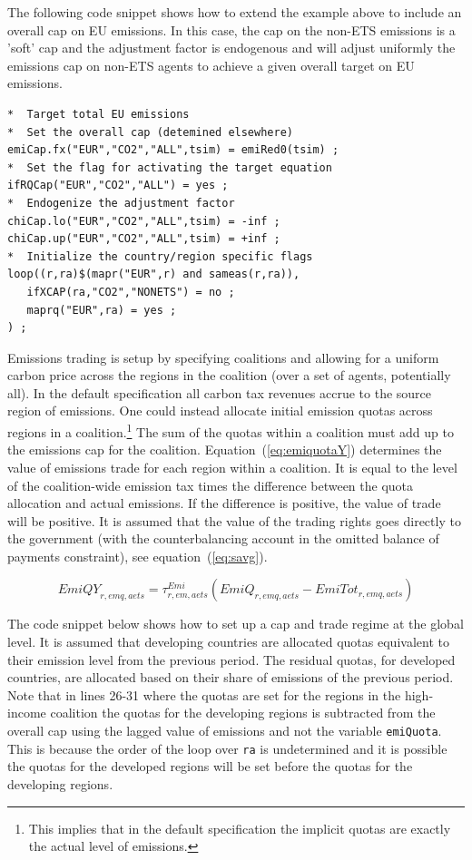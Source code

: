 \documentclass[11pt,letterpaper]{report}
\begin{document}
The following code snippet shows how to extend the example above to include
an overall cap on EU emissions. In this case, the cap on the non-ETS emissions
is a 'soft' cap and the adjustment factor is endogenous and will adjust
uniformly the emissions cap on non-ETS agents to achieve a given
overall target on EU emissions.

\begin{lstlisting}[language=GAMS, caption={Example of ETS regime with a hard overall cap}]
*  Target total EU emissions
*  Set the overall cap (detemined elsewhere)
emiCap.fx("EUR","CO2","ALL",tsim) = emiRed0(tsim) ;
*  Set the flag for activating the target equation
ifRQCap("EUR","CO2","ALL") = yes ;
*  Endogenize the adjustment factor
chiCap.lo("EUR","CO2","ALL",tsim) = -inf ;
chiCap.up("EUR","CO2","ALL",tsim) = +inf ;
*  Initialize the country/region specific flags
loop((r,ra)$(mapr("EUR",r) and sameas(r,ra)),
   ifXCAP(ra,"CO2","NONETS") = no ;
   maprq("EUR",ra) = yes ;
) ;
\end{lstlisting}

Emissions trading is setup by specifying coalitions and allowing for a uniform
carbon price across the regions in the coalition (over a set of agents, potentially all).
In the default specification all
carbon tax revenues accrue to the source region of emissions. One could
instead allocate initial emission quotas across regions in a coalition.\footnote{This implies
that in the default specification the implicit quotas are exactly the
actual level of emissions.} The sum of
the quotas within a coalition must add up to the emissions cap for the
coalition. Equation~(\ref{eq:emiquotaY}) determines the value of emissions trade
for each region within a coalition. It is equal to the level of the
coalition-wide emission tax times the difference between the quota allocation
and actual emissions. If the difference is positive, the value of trade will be
positive. It is assumed that the value of the trading rights goes directly to
the government (with the counterbalancing account in the omitted balance of
payments constraint), see equation~(\ref{eq:savg}).

\begin{equation}
\label{eq:emiquotaY}
\mathit{EmiQY}_{r,\mathit{emq},\mathit{aets}} =
   \tau^{\mathit{Emi}}_{r,\mathit{em},\mathit{aets}} \left(
      \mathit{EmiQ}_{r,\mathit{emq},\mathit{aets}} - \mathit{EmiTot}_{r,\mathit{emq},\mathit{aets}}
   \right)
\end{equation}

The code snippet below shows
how to set up a cap and trade regime at the global level. It is assumed that
developing countries are allocated quotas equivalent to their emission level
from the previous period. The residual quotas, for developed countries, are
allocated based on their share of emissions of the previous period. Note that in
lines 26-31 where the quotas are set for the regions in the high-income
coalition the quotas for the developing regions is subtracted from the overall
cap using the lagged value of emissions and not the variable \texttt{emiQuota}.
This is because the order of the loop over \texttt{ra} is undetermined and it is
possible the quotas for the developed regions will be set before the quotas
for the developing regions.
\end{document}

